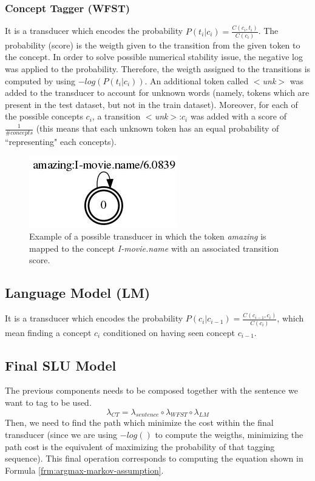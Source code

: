 \documentclass[11pt,a4paper]{article}
\begin{document}
\subsubsection{Concept Tagger (WFST)}
It is a transducer which encodes the probability $P(t_i|c_i) = \frac{C(c_i, t_i)}{C(c_i)}$. The probability (score) is the weigth given to the transition from the given token to the concept. In order to solve possible numerical stability issue, the negative log was applied to the probability. Therefore, the weigth assigned to the transitions is computed by using $-log(P(t_i|c_i))$. An additional token called $<$\textit{unk}$>$ was added to the transducer to account for unknown words (namely, tokens which are present in the test dataset, but not in the train dataset). Moreover, for each of the possible concepts $c_i$, a transition $<$\textit{unk}$>$:$c_i$ was added with a score of $\frac{1}{\#concepts}$ (this means that each unknown token has an equal probability of ``representing" each concepts). 
\begin{figure}[b!]
	\centering
	\includegraphics[width=0.5\linewidth]{img/pos-tagger}
	\caption{Example of a possible transducer in which the token \textit{amazing} is mapped to the concept \textit{I-movie.name} with an associated transition score.}
\end{figure}

\subsection{Language Model (LM)}
It is a transducer which encodes the probability $P(c_i|c_{i-1}) = \frac{C(c_{i-1}, c_i)}{C(c_i)}$, which mean finding a concept $c_i$ conditioned on having seen concept $c_{i-1}$. 

\subsection{Final SLU Model}

The previous components needs to be composed together with the sentence we want to tag to be used.
\begin{equation}
\lambda_{CT} = \lambda_{sentence} \circ \lambda_{WFST} \circ \lambda_{LM}
\end{equation}
Then, we need to find the path which minimize the cost within the final transducer (since we are using $-log()$ to compute the weigths, minimizing the path cost is the equivalent of maximizing the probability of that tagging sequence). This final operation corresponds to computing the equation shown in Formula \ref{frm:argmax-markov-assumption}.
\end{document}
